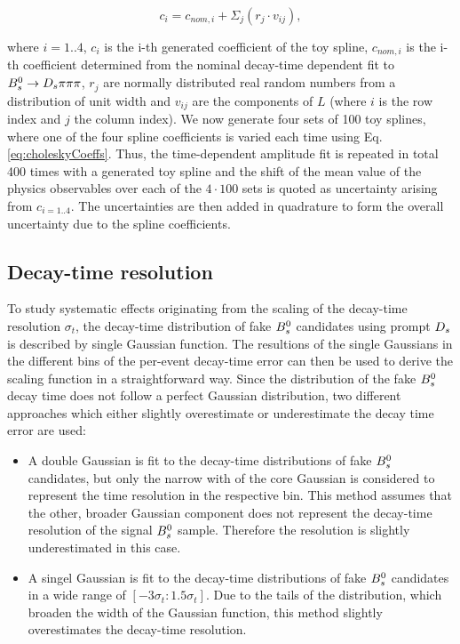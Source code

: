 \begin{equation}
c_{i} = c_{nom,i} + \Sigma_{j} \left(r_{j} \cdot v_{ij} \right),
\label{eq:choleskyCoeffs}
\end{equation}

where $i=1..4$, $c_{i}$ is the i-th generated coefficient of the toy spline, $c_{nom,i}$ is the i-th coefficient determined from the nominal decay-time dependent fit to ${{B}^0_{s}}\rightarrow{\ensuremath{{D}_{s}}}{\ensuremath{\pi}}{\ensuremath{\pi}}{\ensuremath{\pi}}$, 
$r_{j}$ are normally distributed real random numbers from a distribution of unit width and $v_{ij}$ are the components of $L$ (where $i$ is the row index and $j$ the column index). \newline
We now generate four sets of 100 toy splines, where one of the four spline coefficients is varied each time using Eq. \ref{eq:choleskyCoeffs}. 
Thus, the time-dependent amplitude fit is repeated in total 400 times with a generated toy spline and the shift of the mean value of the physics observables over each of the $4\cdot100$ sets is quoted as 
uncertainty arising from $c_{i=1..4}$. The uncertainties are then added in quadrature to form the overall uncertainty due to the spline coefficients. %

%


\subsection{Decay-time resolution}

To study systematic effects originating from the scaling of the decay-time resolution $\sigma_{t}$, the decay-time distribution of fake ${{B}^0_{s}}$ candidates using prompt ${{D}_{s}}$ is described by single Gaussian function.
The resultions of the single Gaussians in the different bins of the per-event decay-time error can then be used to derive the scaling function in a straightforward way.
Since the distribution of the fake ${{B}^0_{s}}$ decay time does not follow a perfect Gaussian distribution, two different approaches which either slightly overestimate or underestimate the decay time error are used:

\begin{itemize}

\item A double Gaussian is fit to the decay-time distributions of fake ${{B}^0_{s}}$ candidates, but only the narrow with of the core Gaussian is considered to represent the time resolution in the respective bin. 
This method assumes that the other, broader Gaussian component does not represent the decay-time resolution of the signal ${{B}^0_{s}}$ sample. Therefore the resolution is slightly underestimated in this case.

\item A singel Gaussian is fit to the decay-time distributions of fake ${{B}^0_{s}}$ candidates in a wide range of $[-3\sigma_{t} : 1.5\sigma_{t}]$. 
Due to the tails of the distribution, which broaden the width of the Gaussian function, this method slightly overestimates the decay-time resolution.   

\end{itemize}

